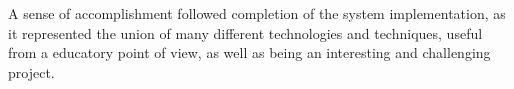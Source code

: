 	A sense of accomplishment followed completion of the system implementation, as it represented the union of many different technologies and techniques, useful from a educatory point of view, as well as being an interesting and challenging project.

